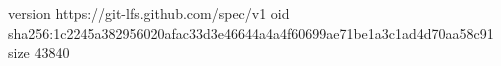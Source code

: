 version https://git-lfs.github.com/spec/v1
oid sha256:1c2245a382956020afac33d3e46644a4a4f60699ae71be1a3c1ad4d70aa58c91
size 43840
